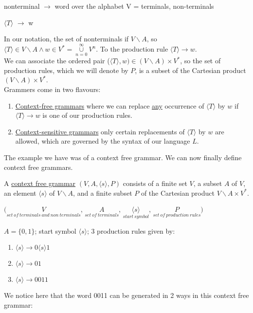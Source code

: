 \documentclass[10pt]{article}
\begin{document}
\begin{description}
\begin{description}
			\item nonterminal $\rightarrow$ word over the alphabet V = {terminals, non-terminals}
			\item $\langle T\rangle $ $\rightarrow$ w
		\end{description}
		In our notation, the set of nonterminals if $V \backslash A$, so $\langle T\rangle \in V \backslash A \land w \in V^* = \underset{n=0}{\overset{\infty}{\cup}} V^n$. To the production rule $\langle T\rangle \rightarrow w$. \\
		We can associate the ordered pair ($\langle T\rangle , w) \in (V \backslash A) \times V^*$, so the set of production rules, which we will denote by $P$, is a subset of the Cartesian product $(V\backslash A) \times V^*$. \\
		Grammers come in two flavours:
		\begin{enumerate}
			\item \underline{Context-free grammars} where we can replace \underline{any} occurrence of $\langle T\rangle $ by $w$ if $\langle T\rangle \rightarrow w$ is one of our production rules.
			\item \underline{Context-sensitive grammars} only certain replacements of $\langle T\rangle $ by $w$ are allowed, which are governed by the syntax of our language $L$.
		\end{enumerate}
		The example we have was of a context free grammar. We can now finally define context free grammars.
		\item[Definition:] A \underline{context free grammar} $(V, A, \langle s\rangle, P)$ consists of a finite set $V$, a subset $A$ of $V$, an element $\langle s \rangle$ of $V \backslash A$, and a finite subset $P$ of the Cartesian product $V\backslash A \times V^*$.
		\item[Notation:] $(\underset{set\:of\:terminals\:and\:non\:terminals}{V}$, $\underset{set\:of\:terminals}{A}$, $\underset{start\:symbol}{\langle s\rangle }$, $\underset{set\:of\:production\:rules}{P})$
		\item[Example:] $A = \{0, 1\}$; start symbol $\langle s\rangle $; 3 production rules given by:
		\begin{enumerate}
			\item $\langle s\rangle \rightarrow 0 \langle s \rangle 1$
			\item $\langle s\rangle \rightarrow 01 $
			\item $\langle s\rangle \rightarrow 0011$
		\end{enumerate}
		We notice here that the word 0011 can be generated in 2 ways in this context free grammar:

\end{description}
\end{document}
